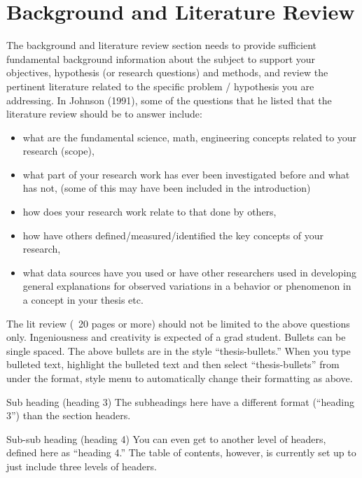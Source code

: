 \chapter{Background and Literature Review} \label{chapterBackground}

The background and literature review section needs to provide sufficient fundamental background information about the subject to support your objectives, hypothesis (or research questions) and methods, and review the pertinent literature related to the specific problem / hypothesis you are addressing. In Johnson (1991), some of the questions that he listed that the literature review should be to answer include: 

\begin{itemize}  
	\item what are the fundamental science, math, engineering concepts related to your research (scope),
	\item what part of your research work has ever been investigated before and what has not, (some of this may have been included in the introduction)
	\item how does your research work relate to that done by others, 
	\item how have others defined/measured/identified the key concepts of your research, 
	\item what data sources have you used or have other researchers used in developing general explanations for observed variations in a behavior or phenomenon in a concept in your thesis etc.  
\end{itemize}

The lit review (~20 pages or more) should not be limited to the above questions only. Ingeniousness and creativity is expected of a grad student.
Bullets can be single spaced.  The above bullets are in the style “thesis-bullets.”  When you type bulleted text, highlight the bulleted text and then select “thesis-bullets” from under the format, style menu to automatically change their formatting as above.



Sub heading (heading 3)
The subheadings here have a different format (“heading 3”) than the section headers.

Sub-sub heading (heading 4)
You can even get to another level of headers, defined here as “heading 4.”  The table of contents, however, is currently set up to just include three levels of headers.


